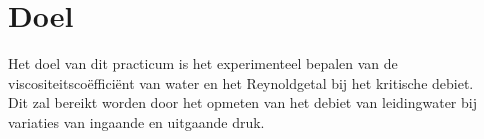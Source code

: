 \section{Doel}

Het doel van dit practicum is het experimenteel bepalen
van de viscositeitsco\"effici\"ent van water en het
Reynoldgetal bij het kritische debiet.\\

Dit zal bereikt worden door het opmeten van het debiet van 
leidingwater bij variaties van ingaande en uitgaande 
druk.
